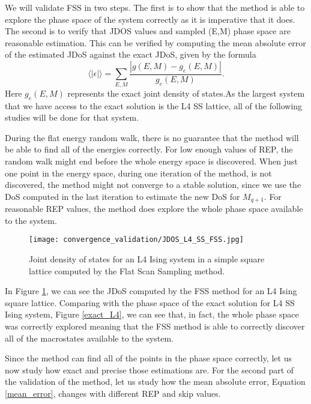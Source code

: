 	We will validate FSS in two steps. The first is to show that the method is able to explore the phase space of the system correctly as it is imperative that it does. The second is to verify that JDOS values and sampled (E,M) phase space are reasonable estimation. This can be verified by computing the mean absolute error of the estimated JDoS against the exact JDoS, given by the formula
\begin{equation}\label{mean_error}
	  \langle |\epsilon|\rangle = \sum_{E, M} \frac{|g(E, M) - g_e(E, M)|}{g_e(E, M)}.
\end{equation} 
Here $g_e(E, M)$ represents the exact joint density of states.As the largest system that we have access to the exact solution is the L4 SS lattice, all of the following studies will be done for that system.

	During the flat energy random walk, there is no guarantee that the method will  be able to find all of the energies correctly. For low enough values of REP, the random walk might end before the whole energy space is discovered. When just one point in the energy space, during one iteration of the method, is not discovered, the method might not converge to a stable solution, since we use the DoS computed in the last iteration to estimate the new DoS for $M_{q+1}$. For reasonable REP values, the method does explore the whole phase space available to the system.
\begin{figure}[h]
	\centering
	\texttt{[image: convergence\_validation/JDOS\_L4\_SS\_FSS.jpg]}
	\caption{Joint density of states for an L4 Ising system in a simple square lattice computed by the Flat Scan Sampling method. }
	\label{jdos_est}
\end{figure}	

\pagebreak
	
	In Figure \ref{jdos_est}, we can see the JDoS computed by the FSS method for an L4 Ising square lattice. Comparing with the phase space of the exact solution for L4 SS Ising system, Figure \ref{exact_L4}, we can see that, in fact, the whole phase space was correctly explored meaning that the FSS method is able to correctly discover all of the macrostates available to the system. 

	Since the method can find all of the points in the phase space correctly, let us now study how exact and precise those estimations are. For the second part of the validation of the method, let us study how the mean absolute error, Equation \ref{mean_error}, changes with different REP and skip values.

